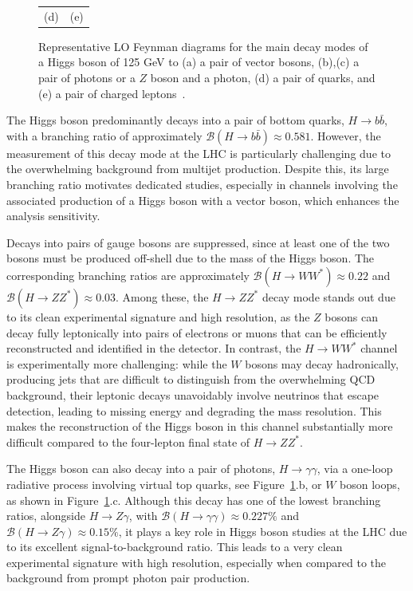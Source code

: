 \begin{figure}[htbp]
{\begin{tabular}{cc}
            (d) & (e)  \\
        \end{tabular}%
    }
    \caption{
        Representative LO Feynman diagrams for the main decay modes of a Higgs boson of 125 GeV to (a) a pair of vector bosons, (b),(c) a pair of photons or a $Z$ boson and a photon,
        (d) a pair of quarks, and (e) a pair of charged leptons~\cite{Nature_ATLAS}.}
    \label{fig:h_decays}
\end{figure}


The Higgs boson predominantly decays into a pair of bottom quarks, \( H \rightarrow b\bar{b} \), with a branching ratio of approximately \( \mathcal{B}(H \rightarrow b\bar{b}) \approx 0.581 \). However, the measurement of this decay mode at the LHC is particularly challenging due to the overwhelming background from multijet production. Despite this, its large branching ratio motivates dedicated studies, especially in channels involving the associated production of a Higgs boson with a vector boson, which enhances the analysis sensitivity.

Decays into pairs of gauge bosons are suppressed, since at least one of the two bosons must be produced off-shell due to the mass of the Higgs boson. The corresponding branching ratios are approximately \( \mathcal{B}(H \rightarrow WW^*) \approx 0.22 \) and \( \mathcal{B}(H \rightarrow ZZ^*) \approx 0.03 \). Among these, the \( H \rightarrow ZZ^* \) decay mode stands out due to its clean experimental signature and high resolution, as the $Z$ bosons can decay fully leptonically into pairs of electrons or muons that can be efficiently reconstructed and identified in the detector. 
In contrast, the \( H \rightarrow WW^* \) channel is experimentally more challenging: while the $W$ bosons may decay hadronically, producing jets that are difficult to distinguish from the overwhelming QCD background, their leptonic decays unavoidably involve neutrinos that escape detection, leading to missing energy and degrading the mass resolution. This makes the reconstruction of the Higgs boson in this channel substantially more difficult compared to the four-lepton final state of \( H \rightarrow ZZ^* \).

The Higgs boson can also decay into a pair of photons, \( H \rightarrow \gamma\gamma \), via a one-loop radiative process involving virtual top quarks, see Figure~\ref{fig:h_decays}.b, or $W$ boson loops, as shown in Figure~\ref{fig:h_decays}.c. Although this decay has one of the lowest branching ratios, alongside \( H \rightarrow Z\gamma \), with \( \mathcal{B}(H \rightarrow \gamma\gamma) \approx 0.227\% \) and \( \mathcal{B}(H \rightarrow Z\gamma) \approx 0.15\% \), it plays a key role in Higgs boson studies at the LHC due to its excellent signal-to-background ratio. This leads to a very clean experimental signature with high resolution, especially when compared to the background from prompt photon pair production.

